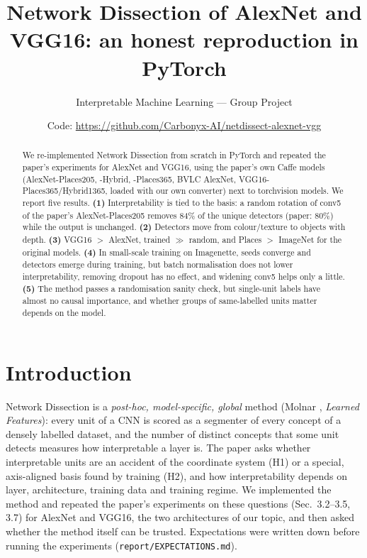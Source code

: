 \documentclass[10pt,a4paper]{article}
\title{\vspace{-1.3cm}\textbf{Network Dissection of AlexNet and VGG16: an honest reproduction in PyTorch}}
\author{Interpretable Machine Learning --- Group Project \\ \fillin{Group members (names, roll numbers)}}
\date{\fillin{Submission date} \quad Code: \url{https://github.com/Carbonyx-AI/netdissect-alexnet-vgg}}
\begin{document}
\maketitle
\vspace{-0.7cm}
\begin{abstract}\noindent
We re-implemented Network Dissection \cite{bau2017} from scratch in PyTorch and repeated the paper's experiments for
AlexNet and VGG16, using the paper's own Caffe models (AlexNet-Places205, -Hybrid, -Places365, BVLC AlexNet,
VGG16-Places365/Hybrid1365, loaded with our own converter) next to torchvision models. We report five results.
\textbf{(1)} Interpretability is tied to the basis: a random rotation of conv5 of the paper's AlexNet-Places205 removes 84\% of
the unique detectors (paper: 80\%) while the output is unchanged. \textbf{(2)} Detectors move from colour/texture to objects
with depth. \textbf{(3)} VGG16 $>$ AlexNet, trained $\gg$ random, and Places $>$ ImageNet for the original models.
\textbf{(4)} In small-scale training on Imagenette, seeds converge and detectors emerge during training, but batch normalisation
does not lower interpretability, removing dropout has no effect, and widening conv5 helps only a little.
\textbf{(5)} The method passes a randomisation sanity check, but single-unit labels have almost no causal importance, and
whether groups of same-labelled units matter depends on the model.
\end{abstract}

\section{Introduction}
Network Dissection is a \emph{post-hoc, model-specific, global} method (Molnar \cite{molnar}, \emph{Learned Features}): every unit of a
CNN is scored as a segmenter of every concept of a densely labelled dataset, and the number of distinct concepts that some
unit detects measures how interpretable a layer is. The paper asks whether interpretable units are an accident of the
coordinate system (H1) or a special, axis-aligned basis found by training (H2), and how interpretability depends on
layer, architecture, training data and training regime. We implemented the method and repeated the paper's experiments on
these questions (Sec.~3.2--3.5, 3.7) for AlexNet and VGG16, the two architectures of our topic, and then asked whether the
method itself can be trusted. Expectations were written down before running the experiments (\texttt{report/EXPECTATIONS.md}).
\end{document}
